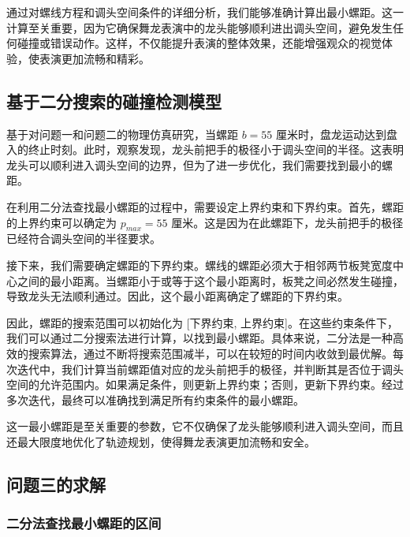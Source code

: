 \documentclass[withoutpreface, bwprint]{cumcmthesis} %
\begin{document}
通过对螺线方程和调头空间条件的详细分析，我们能够准确计算出最小螺距。这一计算至关重要，因为它确保舞龙表演中的龙头能够顺利进出调头空间，避免发生任何碰撞或错误动作。这样，不仅能提升表演的整体效果，还能增强观众的视觉体验，使表演更加流畅和精彩。

\subsection{基于二分搜索的碰撞检测模型}

基于对问题一和问题二的物理仿真研究，当螺距 $b = 55$ 厘米时，盘龙运动达到盘入的终止时刻。此时，观察发现，龙头前把手的极径小于调头空间的半径。这表明龙头可以顺利进入调头空间的边界，但为了进一步优化，我们需要找到最小的螺距。

在利用二分法查找最小螺距的过程中，需要设定上界约束和下界约束。首先，螺距的上界约束可以确定为 $p_{max} = 55$ 厘米。这是因为在此螺距下，龙头前把手的极径已经符合调头空间的半径要求。

接下来，我们需要确定螺距的下界约束。螺线的螺距必须大于相邻两节板凳宽度中心之间的最小距离。当螺距小于或等于这个最小距离时，板凳之间必然发生碰撞，导致龙头无法顺利通过。因此，这个最小距离确定了螺距的下界约束。

因此，螺距的搜索范围可以初始化为 [下界约束, 上界约束]。在这些约束条件下，我们可以通过二分搜索法进行计算，以找到最小螺距。具体来说，二分法是一种高效的搜索算法，通过不断将搜索范围减半，可以在较短的时间内收敛到最优解。每次迭代中，我们计算当前螺距值对应的龙头前把手的极径，并判断其是否位于调头空间的允许范围内。如果满足条件，则更新上界约束；否则，更新下界约束。经过多次迭代，最终可以准确找到满足所有约束条件的最小螺距。

这一最小螺距是至关重要的参数，它不仅确保了龙头能够顺利进入调头空间，而且还最大限度地优化了轨迹规划，使得舞龙表演更加流畅和安全。

\subsection{问题三的求解}

\subsubsection{二分法查找最小螺距的区间}
\end{document}
